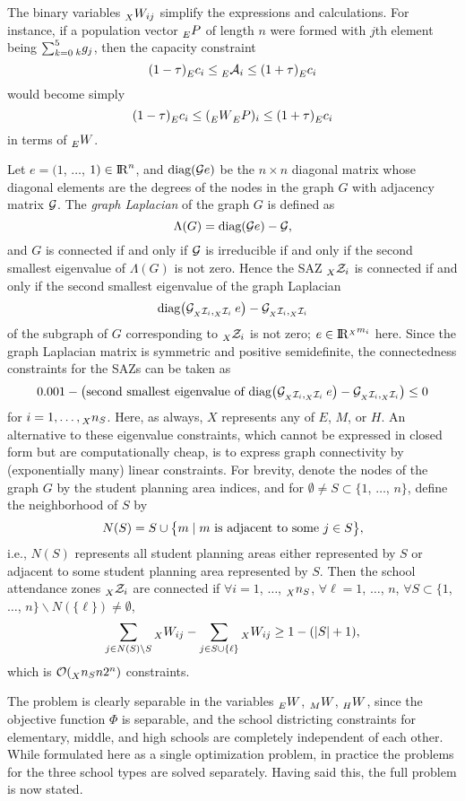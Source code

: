 The binary variables $\u XW_{ij}$ simplify the expressions and calculations.
For instance, if a population vector $\u EP$ of length $n$ were formed with
$j$th element being $\sum_{k=0}^5 \u kg_j$, then the capacity constraint
 $$(1-\tau)\u Ec_i \le \u E{\cal A}_i \le (1+\tau)\u Ec_i$$
would become simply
 $$(1-\tau)\u Ec_i \le (\u EW \u EP)_i \le (1+\tau)\u Ec_i$$
in terms of $\u EW$.

Let $e=(1$, $\ldots$, $1)\in\mathop{\rm I\!R}\nolimits^n$, and $\hbox{diag}
({\cal G}e)$ be the $n\times n$ diagonal matrix whose diagonal elements are
the degrees of the nodes in the graph $G$ with adjacency matrix $\cal G$.
The {\it graph Laplacian\/} of the graph $G$ is defined as
 $$\Lambda(G) = \hbox{diag}({\cal G}e) - {\cal G},$$
and $G$ is connected if and only if $\cal G$ is irreducible if and only if
the second smallest eigenvalue of $\Lambda(G)$ is not zero. Hence the SAZ
$\u X{\cal Z}_i$ is connected if and only if the second smallest eigenvalue of
the graph Laplacian
 $$\hbox{diag}\bigl({\cal G}_{\u X{\cal I}_i,\u X{\cal I}_i} \>e\bigr) -
 {\cal G}_{\u X{\cal I}_i,\u X{\cal I}_i}$$
of the subgraph of $G$ corresponding to $\u X{\cal Z}_i$ is not zero;
$e\in\real^{\u Xm_i}$ here. Since the graph Laplacian matrix is symmetric and
positive semidefinite, the connectedness constraints for the SAZs can
be taken as
 $$0.001 - \bigl(\hbox{second smallest eigenvalue of diag}
 \bigl({\cal G}_{\u X{\cal I}_i,\u X{\cal I}_i} \>e\bigr) -
 {\cal G}_{\u X{\cal I}_i,\u X{\cal I}_i}\bigr) \le 0$$
for $i=1,\ldots,\u Xn_S$. Here, as always, $X$ represents any of $E$, $M$, or
$H$. An alternative to these eigenvalue constraints,
which cannot be expressed in closed form but are computationally cheap,
is to express graph connectivity by (exponentially many) linear constraints.
For brevity, denote the nodes of the graph $G$ by the student planning
area indices, and for $\emptyset \ne S \subset \{1$, $\ldots$, $n\}$, define the
neighborhood of $S$ by 
 $$N(S)=S \cup \bigl\{m\mid m \hbox{ is adjacent to some }j\in S\bigr\},$$
i.e., $N(S)$ represents all student planning areas either represented by $S$ or adjacent to some student planning area represented by $S$. 
Then the school attendance zones $\u X{\cal Z}_i$ are connected
if $\forall i=1$, $\ldots$, $\u Xn_S$, $\forall\ell=1$, $\ldots$, $n$,
$\forall S \subset\{1$, $\ldots$, $n\} \backslash N(\{\ell\}) \ne\emptyset$,
 $$\sum_{j\in N(S)\backslash S} \u XW_{ij} -
 \sum_{j\in S\cup\{\ell\}} \u XW_{ij} \ge 1-(|S|+1),$$
which is ${\cal O}(\u Xn_S n2^n)$ constraints.

The problem is clearly separable in the variables $\u EW$, $\u MW$,
$\u HW$, since the objective function $\Phi$ is separable, and the school
districting constraints for elementary, middle, and high schools are
completely independent of each other. While formulated here as a single
optimization problem, in practice the problems for the three school types
are solved separately. Having said this, the full problem is now stated.

